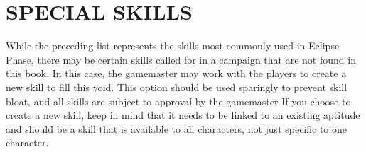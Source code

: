 \section{SPECIAL SKILLS} While the preceding list represents the skills most commonly used in Eclipse Phase, there may be certain skills called for in a campaign that are not found in this book. In this case, the gamemaster may work with the players to create a new skill to fill this void. This option should be used sparingly to prevent skill bloat, and all skills are subject to approval by the gamemaster If you choose to create a new skill, keep in mind that it needs to be linked to an existing aptitude and should be a skill that is available to all characters, not just specific to one character. 







































































































































